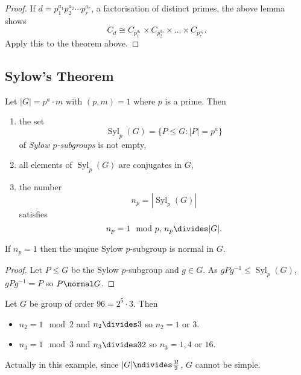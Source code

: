 \documentclass[a4paper]{article}
\DeclareMathOperator{\syl}{Syl}
\begin{document}
\begin{proof}
  If \(d = p_1^{a_1}p_2^{a_2}\cdots p_r^{a_r}\), a factorisation of distinct primes, the above lemma shows
  \[
    C_d \cong C_{p_1^{a_1}} \times C_{p_2^{a_2}} \times \dots \times C_{p_r^{a_r}}.
  \]
  Apply this to the theorem above.
\end{proof}

\subsection{Sylow's Theorem}

\begin{theorem}
  \label{thm:sylow}
  Let \(|G| = p^a \cdot m\) with \((p, m) = 1\) where \(p\) is a prime. Then
  \begin{enumerate}
  \item the set
    \[
      \syl_p(G) = \{P \leq G: |P| = p^a\}
    \]
    of \emph{Sylow \(p\)-subgroups} is not empty,
  \item all elements of \(\syl_p(G)\) are conjugates in \(G\),
  \item the number
    \[
      n_p = |\syl_p(G)|
    \]
    satisfies
    \[
      n_p = 1 \mod p, \, n_p \divides |G|.
    \]
  \end{enumerate}
\end{theorem}

\begin{lemma}
  If \(n_p = 1\) then the unqiue Sylow \(p\)-subgroup is normal in \(G\).
\end{lemma}

\begin{proof}
  Let \(P \leq G\) be the Sylow \(p\)-subgroup and \(g \in G\). As \(gPg^{-1} \leq \syl_p(G)\), \(gPg^{-1} = P\) so \(P \normal G\).
\end{proof}

\begin{eg}
  Let \(G\) be group of order \(96 = 2^5 \cdot 3\). Then
  \begin{itemize}
  \item \(n_2 = 1 \mod 2\) and \(n_2 \divides 3\) so \(n_2 = 1\) or \(3\).
  \item \(n_3 = 1 \mod 3\) and \(n_3 \divides 32\) so \(n_3 = 1, 4\) or \(16\).
  \end{itemize}
  Actually in this example, since \(|G| \ndivides \frac{3!}{2}\), \(G\) cannot be simple.
\end{eg}
\end{document}
